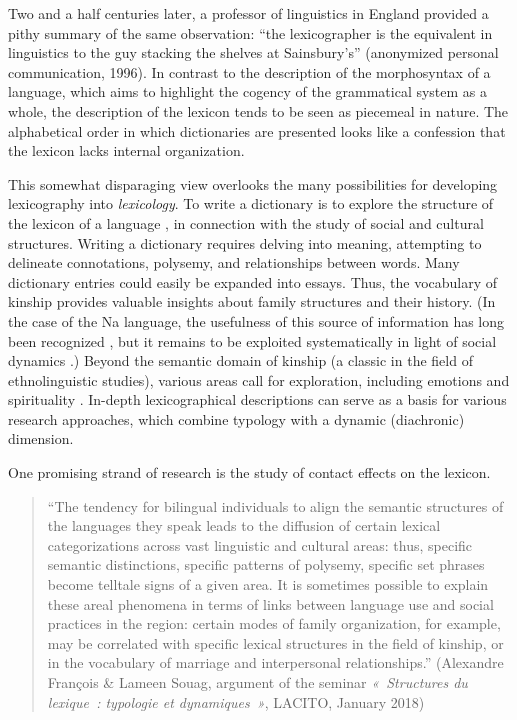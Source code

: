 Two and a half centuries later, a professor of linguistics in England provided a pithy summary of the same observation: “the lexicographer is the equivalent in linguistics to the guy stacking the shelves at Sainsbury’s” (anonymized personal communication, 1996). In contrast to the description of the morphosyntax of a language, which aims to highlight the cogency of the grammatical system as a whole, the description of the lexicon tends to be seen as piecemeal in nature. The alphabetical order in which dictionaries are presented looks like a confession that the lexicon lacks internal organization.

This somewhat disparaging view overlooks the many possibilities for developing lexicography into \emph{lexicology}. To write a dictionary is to explore the structure of the lexicon of a language \parencite{francois2008semantic}, in connection with the study of social and cultural structures. Writing a dictionary requires delving into meaning, attempting to delineate connotations, polysemy, and relationships between words. Many dictionary entries could easily be expanded into essays. Thus, the vocabulary of kinship provides valuable insights about family structures and their history. (In the case of the Na language, the usefulness of this source of information has long been recognized \parencite{fu1983}, but it remains to be exploited systematically in light of social dynamics \parencite{milan2021entraide}.) Beyond the semantic domain of kinship (a classic in the field of ethnolinguistic studies), various areas call for exploration, including emotions \parencite{tersis_langage_2017} and spirituality \parencite{francois_shadows_2013}. In-depth lexicographical descriptions can serve as a basis for various research approaches, which combine typology with a dynamic (diachronic) dimension.

One promising strand of research is the study of contact effects on the lexicon.

\begin{quotation}
    “The tendency for bilingual individuals to align the semantic structures of the languages they speak leads to the diffusion of certain lexical categorizations across vast linguistic and cultural areas: thus, specific semantic distinctions, specific patterns of polysemy, specific set phrases become telltale signs of a given area. It is sometimes possible to explain these areal phenomena in terms of links between language use and social practices in the region: certain modes of family organization, for example, may be correlated with specific lexical structures in the field of kinship, or in the vocabulary of marriage and interpersonal relationships.” (Alexandre François \& Lameen Souag, argument of the seminar \emph{« Structures du lexique : typologie et dynamiques »}, LACITO, January 2018)
\end{quotation}

